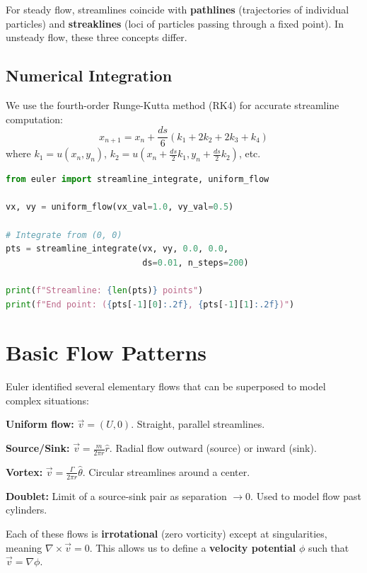 For steady flow, streamlines coincide with \textbf{pathlines} (trajectories of individual particles)
and \textbf{streaklines} (loci of particles passing through a fixed point). In unsteady flow,
these three concepts differ.

\subsection{Numerical Integration}

We use the fourth-order Runge-Kutta method (RK4) for accurate streamline computation:
\[
x_{n+1} = x_n + \frac{ds}{6}(k_1 + 2k_2 + 2k_3 + k_4)
\]
where $k_1 = u(x_n, y_n)$, $k_2 = u(x_n + \tfrac{ds}{2}k_1, y_n + \tfrac{ds}{2}k_2)$, etc.

\begin{lstlisting}[language=Python, caption=Computing a streamline]
from euler import streamline_integrate, uniform_flow

vx, vy = uniform_flow(vx_val=1.0, vy_val=0.5)

# Integrate from (0, 0)
pts = streamline_integrate(vx, vy, 0.0, 0.0,
                           ds=0.01, n_steps=200)

print(f"Streamline: {len(pts)} points")
print(f"End point: ({pts[-1][0]:.2f}, {pts[-1][1]:.2f})")
\end{lstlisting}

\section{Basic Flow Patterns}

Euler identified several elementary flows that can be superposed to model complex situations:

\textbf{Uniform flow:} $\vec{v} = (U, 0)$. Straight, parallel streamlines.

\textbf{Source/Sink:} $\vec{v} = \frac{m}{2\pi r} \hat{r}$. Radial flow outward (source) or inward (sink).

\textbf{Vortex:} $\vec{v} = \frac{\Gamma}{2\pi r} \hat{\theta}$. Circular streamlines around a center.

\textbf{Doublet:} Limit of a source-sink pair as separation $\to 0$. Used to model flow past cylinders.

Each of these flows is \textbf{irrotational} (zero vorticity) except at singularities,
meaning $\nabla \times \vec{v} = 0$. This allows us to define a \textbf{velocity potential}
$\phi$ such that $\vec{v} = \nabla \phi$.

